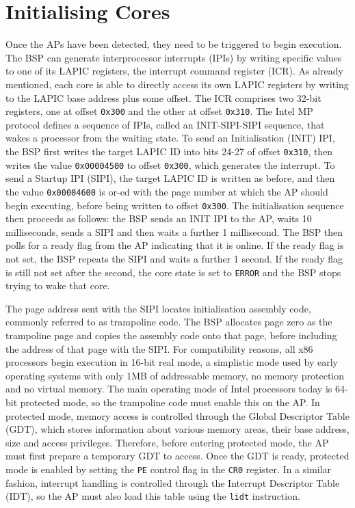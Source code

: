 \documentclass[bsc,frontabs,twoside,singlespacing,parskip,deptreport]{infthesis}     %
\begin{document}
\section{Initialising Cores} \label{initialising-cores}
Once the APs have been detected, they need to be triggered to begin execution. The BSP can generate interprocessor interrupts (IPIs) by writing specific values to one of its LAPIC registers, the interrupt command register (ICR). As already mentioned, each core is able to directly access its own LAPIC registers by writing to the LAPIC base address plus some offset. The ICR comprises two 32-bit registers, one at offset \verb|0x300| and the other at offset \verb|0x310|. The Intel MP protocol defines a sequence of IPIs, called an INIT-SIPI-SIPI sequence, that wakes a processor from the waiting state. To send an Initialisation (INIT) IPI, the BSP first writes the target LAPIC ID into bits 24-27 of offset \verb|0x310|, then writes the value \verb|0x00004500| to offset \verb|0x300|, which generates the interrupt. To send a Startup IPI (SIPI), the target LAPIC ID is written as before, and then the value \verb|0x00004600| is or-ed with the page number at which the AP should begin executing, before being written to offset \verb|0x300|. The initialisation sequence then proceeds as follows: the BSP sends an INIT IPI to the AP, waits 10 milliseconds, sends a SIPI and then waits a further 1 millisecond. The BSP then polls for a ready flag from the AP indicating that it is online. If the ready flag is not set, the BSP repeats the SIPI and waits a further 1 second. If the ready flag is still not set after the second, the core state is set to \verb|ERROR| and the BSP stops trying to wake that core.

The page address sent with the SIPI locates initialisation assembly code, commonly referred to as trampoline code. The BSP allocates page zero as the trampoline page and copies the assembly code onto that page, before including the address of that page with the SIPI. For compatibility reasons, all x86 processors begin execution in 16-bit real mode, a simplistic mode used by early operating systems with only 1MB of addressable memory, no memory protection and no virtual memory. The main operating mode of Intel processors today is 64-bit protected mode, so the trampoline code must enable this on the AP. In protected mode, memory access is controlled through the Global Descriptor Table (GDT), which stores information about various memory areas, their base address, size and access privileges. Therefore, before entering protected mode, the AP must first prepare a temporary GDT to access. Once the GDT is ready, protected mode is enabled by setting the \verb|PE| control flag in the \verb|CR0| register. In a similar fashion, interrupt handling is controlled through the Interrupt Descriptor Table (IDT), so the AP must also load this table using the \verb|lidt| instruction.
\end{document}
